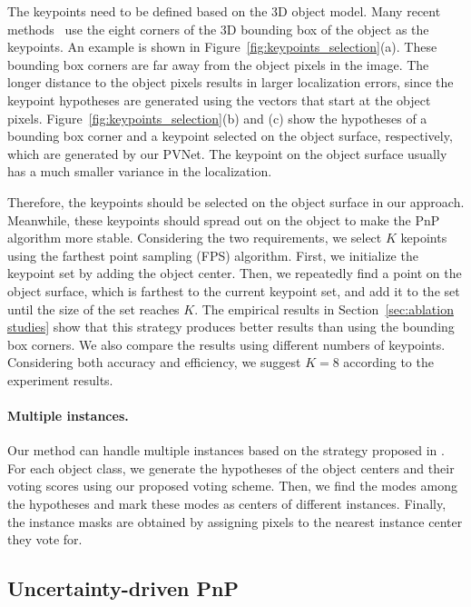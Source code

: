 \documentclass[10pt,twocolumn,letterpaper]{article}
\begin{document}
The keypoints need to be defined based on the 3D object model. Many recent methods~\cite{rad2017bb8, tekin2018real, oberweger2018making} use the eight corners of the 3D bounding box of the object as the keypoints. An example is shown in Figure~\ref{fig:keypoints_selection}(a). These bounding box corners are far away from the object pixels in the image. 
The longer distance to the object pixels results in larger localization errors, since the keypoint hypotheses are generated using the vectors that start at the object pixels.
Figure~\ref{fig:keypoints_selection}(b) and (c) show the hypotheses of a bounding box corner and a keypoint selected on the object surface, respectively, which are generated by our PVNet. The keypoint on the object surface usually has a much smaller variance in the localization. 



Therefore, the keypoints should be selected on the object surface in our approach. Meanwhile, these keypoints should spread out on the object to make the PnP algorithm more stable. Considering the two requirements, we select $K$ kepoints using the farthest point sampling (FPS) algorithm. First, we initialize the keypoint set by adding the object center. Then, we repeatedly find a point on the object surface, which is farthest to the current keypoint set, and add it to the set until the size of the set reaches $K$. The empirical results in Section~\ref{sec:ablation studies} show that this strategy produces better results than using the bounding box corners. We also compare the results using different numbers of keypoints. Considering both accuracy and efficiency, we suggest $K=8$ according to the experiment results.




\paragraph{Multiple instances.}

Our method can handle multiple instances based on the strategy proposed in \cite{xiang2017posecnn, papandreou2018personlab}. For each object class, we generate the hypotheses of the object centers and their voting scores using our proposed voting scheme.
Then, we find the modes among the hypotheses and mark these modes as centers of different instances. Finally, the instance masks are obtained by assigning pixels to the nearest instance center they vote for.




\subsection{Uncertainty-driven PnP}
\label{sec:uncertainty-driven pnp}
\end{document}
